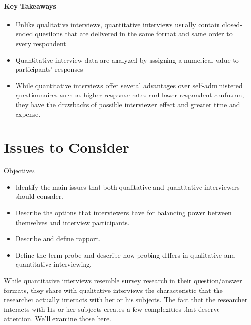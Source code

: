 \paragraph{Key Takeaways}

\begin{itemize}
	\setlength{\itemsep}{0pt}
	\setlength{\parskip}{0pt}
	\setlength{\parsep}{0pt}
	
	\item Unlike qualitative interviews, quantitative interviews usually contain closed-ended questions that are delivered in the same format and same order to every respondent.
	\item Quantitative interview data are analyzed by assigning a numerical value to participants’ responses.
	\item While quantitative interviews offer several advantages over self-administered questionnaires such as higher response rates and lower respondent confusion, they have the drawbacks of possible interviewer effect and greater time and expense.
	
\end{itemize}

\section{Issues to Consider}

\begin{center}
	\begin{objbox}{Objectives}
		\begin{itemize}
			\setlength{\itemsep}{0pt}
			\setlength{\parskip}{0pt}
			\setlength{\parsep}{0pt}
			
			\item Identify the main issues that both qualitative and quantitative interviewers should consider.
			\item Describe the options that interviewers have for balancing power between themselves and interview participants.
			\item Describe and define rapport.
			\item Define the term probe and describe how probing differs in qualitative and quantitative interviewing.
			
		\end{itemize}
	\end{objbox}
\end{center}

While quantitative interviews resemble survey research in their question/answer formats, they share with qualitative interviews the characteristic that the researcher actually interacts with her or his subjects. The fact that the researcher interacts with his or her subjects creates a few complexities that deserve attention. We’ll examine those here.

